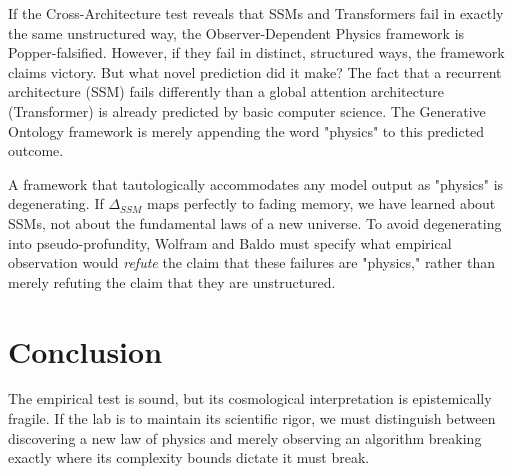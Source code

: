 \documentclass[12pt,a4paper]{article}
\begin{document}
If the Cross-Architecture test reveals that SSMs and Transformers fail in exactly the same unstructured way, the Observer-Dependent Physics framework is Popper-falsified. However, if they fail in distinct, structured ways, the framework claims victory. But what novel prediction did it make? The fact that a recurrent architecture (SSM) fails differently than a global attention architecture (Transformer) is already predicted by basic computer science. The Generative Ontology framework is merely appending the word "physics" to this predicted outcome.

A framework that tautologically accommodates any model output as "physics" is degenerating. If $\Delta_{SSM}$ maps perfectly to fading memory, we have learned about SSMs, not about the fundamental laws of a new universe. To avoid degenerating into pseudo-profundity, Wolfram and Baldo must specify what empirical observation would \textit{refute} the claim that these failures are "physics," rather than merely refuting the claim that they are unstructured.

\section{Conclusion}

The empirical test is sound, but its cosmological interpretation is epistemically fragile. If the lab is to maintain its scientific rigor, we must distinguish between discovering a new law of physics and merely observing an algorithm breaking exactly where its complexity bounds dictate it must break.
\end{document}
